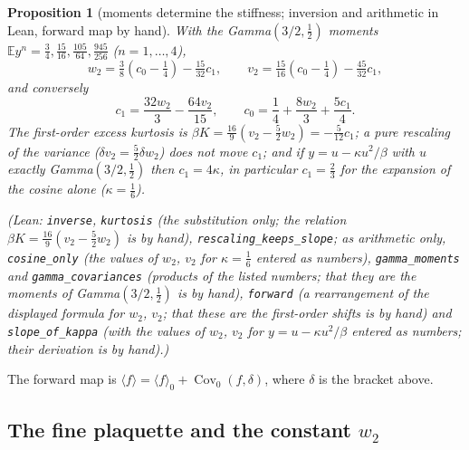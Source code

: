 \documentclass[11pt,a4paper]{article}
\newtheorem{proposition}[theorem]{Proposition}
\theoremstyle{definition}
\theoremstyle{remark}
\newcommand{\E}{\mathbb{E}}
\newcommand{\code}[1]{\texttt{#1}}
\begin{document}
\begin{proposition}[moments determine the stiffness; inversion and arithmetic in Lean, forward map by hand]\label{prop:moments}
With the Gamma$(3/2,\frac12)$ moments $\E y^n=\frac34,\frac{15}{16},\frac{105}{64},\frac{945}{256}$ ($n=1,\dots,4$),
\[
w_2=\tfrac38(c_0-\tfrac14)-\tfrac{15}{32}c_1,\qquad v_2=\tfrac{15}{16}(c_0-\tfrac14)-\tfrac{45}{32}c_1,
\]
and conversely
\[
c_1=\frac{32w_2}{3}-\frac{64v_2}{15},\qquad c_0=\frac14+\frac{8w_2}{3}+\frac{5c_1}{4}.
\]
The first-order excess kurtosis is $\beta K=\frac{16}9(v_2-\frac52w_2)=-\frac5{12}c_1$; a pure rescaling of the variance ($\delta v_2=\frac52\delta w_2$) does not move $c_1$; and if $y=u-\kappa u^2/\beta$ with $u$ exactly Gamma$(3/2,\frac12)$ then $c_1=4\kappa$, in particular $c_1=\frac23$ for the expansion of the cosine alone ($\kappa=\frac16$).
{\sloppy (Lean: \code{inverse}, \code{kurtosis} (the substitution only; the relation $\beta K=\frac{16}9(v_2-\frac52w_2)$ is by hand), \code{rescaling\_keeps\_slope}; as arithmetic only, \code{cosine\_only} (the values of $w_2$, $v_2$ for $\kappa=\frac16$ entered as numbers), \code{gamma\_moments} and \code{gamma\_covariances} (products of the listed numbers; that they are the moments of Gamma$(3/2,\frac12)$ is by hand), \code{forward} (a rearrangement of the displayed formula for $w_2$, $v_2$; that these are the first-order shifts is by hand) and \code{slope\_of\_kappa} (with the values of $w_2$, $v_2$ for $y=u-\kappa u^2/\beta$ entered as numbers; their derivation is by hand).)\par}
\end{proposition}

The forward map is $\langle f\rangle=\langle f\rangle_0+\operatorname{Cov}_0(f,\delta)$, where $\delta$ is the bracket above.

\subsection{The fine plaquette and the constant \texorpdfstring{$w_2$}{w2}}
\end{document}
